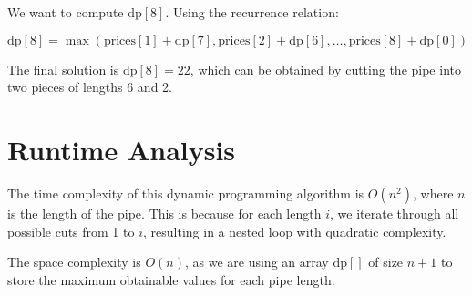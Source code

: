 \documentclass[11pt]{article}
\begin{document}
We want to compute \( \text{dp}[8] \). Using the recurrence relation:

\[
\text{dp}[8] = \max(\text{prices}[1] + \text{dp}[7], \text{prices}[2] + \text{dp}[6], \dots, \text{prices}[8] + \text{dp}[0])
\]

The final solution is \( \text{dp}[8] = 22 \), which can be obtained by cutting the pipe into two pieces of lengths 6 and 2.

\section*{Runtime Analysis}

The time complexity of this dynamic programming algorithm is \( O(n^2) \), where \( n \) is the length of the pipe. This is because for each length \( i \), we iterate through all possible cuts from 1 to \( i \), resulting in a nested loop with quadratic complexity.

The space complexity is \( O(n) \), as we are using an array \( \text{dp}[] \) of size \( n+1 \) to store the maximum obtainable values for each pipe length.

\newpage
\end{document}
